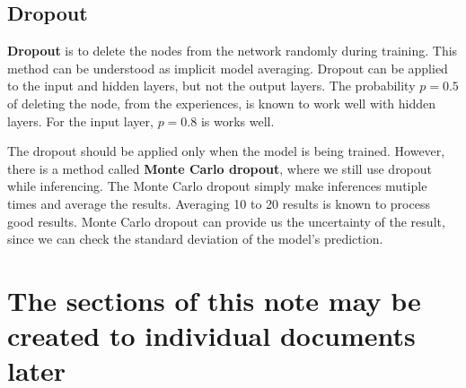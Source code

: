 \documentclass{article}
\begin{document}
    \subsection{Dropout}
        \textbf{Dropout} is to delete the nodes from the network randomly during training. This method can be understood as implicit model averaging.
        Dropout can be applied to the input and hidden layers, but not the output layers. The probability $p=0.5$ of deleting the node, from the experiences,
        is known to work well with hidden layers. For the input layer, $p=0.8$ is works well.
        
        The dropout should be applied only when the model is being trained. However, there is a method called \textbf{Monte Carlo dropout}, where we
        still use dropout while inferencing. The Monte Carlo dropout simply make inferences mutiple times and average the results. Averaging 10 to 20 results
        is known to process good results.
        Monte Carlo dropout can provide us the uncertainty of the result, since we can check the standard deviation of the model's prediction.

\section{The sections of this note may be created to individual documents later}
\end{document}
